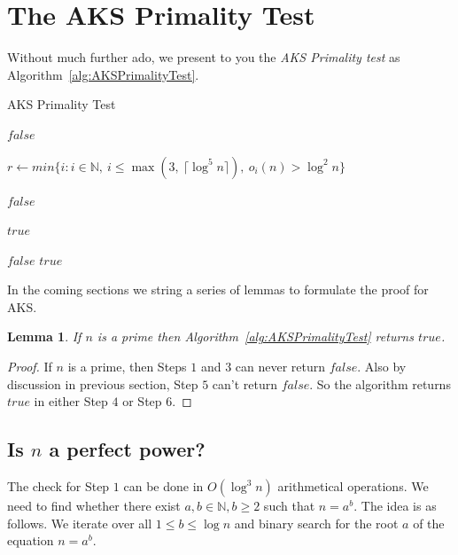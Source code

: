 \documentclass[11pt]{report}
\newtheorem{lemma}[theorem]{Lemma}
\begin{document}
\section {The AKS Primality Test}
Without much further ado, we present to you the \emph{AKS Primality test} as Algorithm~\ref{alg:AKSPrimalityTest}.

\begin{algorithm}
\caption{AKS Primality Test}
\label{alg:AKSPrimalityTest}
\begin{algorithmic}

	\State \Return $false$  
\EndIf

\State $r \gets min \{i: i \in \mathbb{N},\ i \leq \max(3,\ \lceil \log^5 n \rceil),\ o_i(n) > \log^2 n \}$ 

		\State \Return $false$  
	\EndIf
\EndFor

	\Return $true$  
\EndIf

		\State \Return $false$  
	\EndIf
\EndFor
\State \Return $true$ 
\EndProcedure
\end{algorithmic}
\end{algorithm}


In the coming sections we string a series of lemmas to formulate the proof for AKS.

\begin{lemma}
\label{lemma:AKSLemma1}
If $n$ is a prime then Algorithm~\ref{alg:AKSPrimalityTest} returns $true$.
\end{lemma}
 
\begin{proof}
If $n$ is a prime, then Steps $1$ and $3$ can never return $false$. Also by discussion in previous section, Step $5$ can't return $false$. So the algorithm returns $true$ in either Step $4$ or Step $6$.
\end{proof}

\subsection{Is $n$ a perfect power?}
The check for Step $1$ can be done in $O(\log^3 n)$ arithmetical operations. We need to find whether there exist $a, b \in \mathbb{N}, b \geq 2$ such that $n = a^b$. The idea is as follows. We iterate over all $1 \leq b \leq \log n$ and binary search for the root $a$ of the equation $n = a^b$. 
\end{document}
